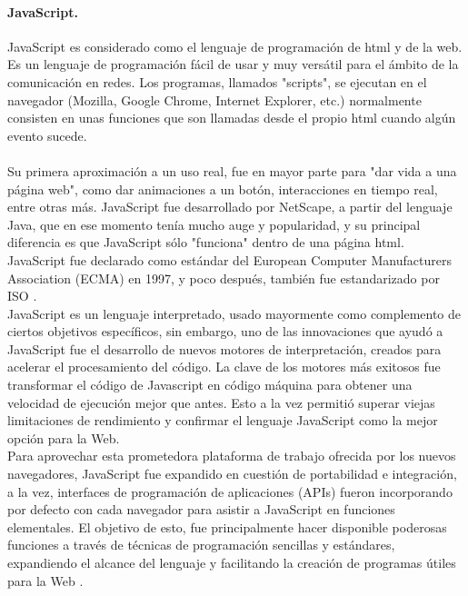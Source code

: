 \documentclass[12pt, a4paper, titlepage]{report}
\begin{document}
			\paragraph {JavaScript. \\}
			JavaScript es considerado como el lenguaje de programación de html y de la web. Es un lenguaje de programación fácil de usar y muy versátil para el ámbito de la comunicación en redes. Los programas, llamados "scripts", se ejecutan en el navegador (Mozilla, Google Chrome, Internet Explorer, etc.) normalmente consisten en unas funciones que son llamadas desde el propio html cuando algún evento sucede.\\\\
			Su primera aproximación a un uso real, fue en mayor parte para "dar vida a una página web", como dar animaciones a un botón, interacciones en tiempo real, entre otras más. 
			JavaScript fue desarrollado por \Gls{NetScape}, a partir del lenguaje Java, que en ese momento tenía mucho auge y popularidad, y su principal diferencia es que JavaScript sólo "funciona" dentro de una página html.\\
			JavaScript fue declarado como estándar del European Computer Manufacturers Association (ECMA) en 1997, y poco después, también fue estandarizado por ISO \cite{refJavaScript}. \\ 
			JavaScript es un lenguaje interpretado, usado mayormente como complemento de ciertos objetivos específicos, sin embargo, uno de las innovaciones que ayudó a JavaScript fue el desarrollo de nuevos motores de interpretación, creados para acelerar el procesamiento del código. La clave de los motores más exitosos fue transformar el código de Javascript en código máquina para obtener una velocidad de ejecución mejor que antes. Esto a la vez permitió superar viejas limitaciones de rendimiento y confirmar el lenguaje JavaScript como la mejor opción para la Web.\\
			
			Para aprovechar esta prometedora plataforma de trabajo ofrecida por los nuevos navegadores, JavaScript fue expandido en cuestión de portabilidad e integración, a la vez, interfaces de programación de aplicaciones (APIs) fueron incorporando por defecto con cada navegador para asistir a JavaScript en funciones elementales. El objetivo de esto, fue principalmente hacer disponible poderosas funciones a través de técnicas de programación sencillas y estándares, expandiendo el alcance del lenguaje y facilitando la creación de programas útiles para la Web \cite{refElGranLibro}.
			
\end{document}
